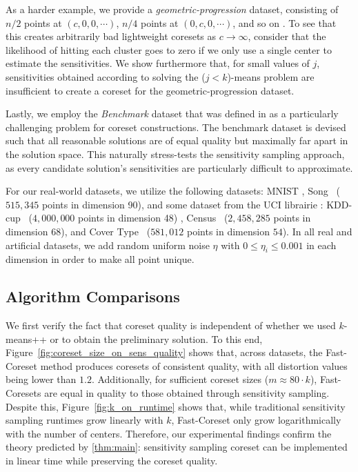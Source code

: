 As a harder example, we provide a \emph{geometric-progression} dataset, consisting of $n/2$ points at $(c, 0, 0, \cdots)$, $n/4$ points at $(0, c, 0, \cdots)$,
and so on . To see that this creates arbitrarily bad lightweight coresets as $c \rightarrow \infty$, consider that the likelihood of hitting each cluster goes to
zero if we only use a single center to estimate the sensitivities. We show furthermore that, for small values of $j$, sensitivities obtained
according to solving the ($j<k$)-means problem are insufficient to create a coreset for the geometric-progression dataset.

Lastly, we employ the \emph{Benchmark} dataset that was defined in \cite{chrisESA} as a particularly challenging problem for coreset constructions.  The
benchmark dataset is devised such that all reasonable solutions are of equal quality but maximally far apart in the solution space. This naturally stress-tests
the sensitivity sampling approach, as every candidate solution's sensitivities are particularly difficult to approximate.

For our real-world datasets, we utilize the following datasets: MNIST , Song~\cite{song} ($515, 345$ points in dimension 90),
and some dataset from the UCI librairie \cite{Dua:2019}: KDD-cup~\cite{kddcup} ($4,000,000$ points in dimension 48) , Census~\cite{census} ($2, 458, 285$ points in dimension 68), and Cover Type~\cite{covtype} ($581,012$ points in dimension $54$).  In
all real and artificial datasets, we add random uniform noise $\eta$ with $0 \leq \eta_i \leq 0.001$ in each dimension in order to make all point unique.

\subsection{Algorithm Comparisons}
\label{ssec:alg_qualities}

We first verify the fact that coreset quality is independent of whether we used $k$-means++ or \fkmeans to obtain the preliminary solution. To this end,
Figure~\ref{fig:coreset_size_on_sens_quality} shows that, across datasets, the Fast-Coreset method produces coresets of consistent quality, with all distortion
values being lower than $1.2$. Additionally, for sufficient coreset sizes ($m \approx 80\cdot k$), Fast-Coresets are equal in quality to those obtained through
sensitivity sampling. Despite this, Figure~\ref{fig:k_on_runtime} shows that, while traditional sensitivity sampling runtimes grow linearly with $k$,
Fast-Coreset only grow logarithmically with the number of centers.
Therefore, our experimental findings confirm the theory predicted by \cref{thm:main}: sensitivity sampling coreset can be implemented in linear time while preserving the coreset quality.

